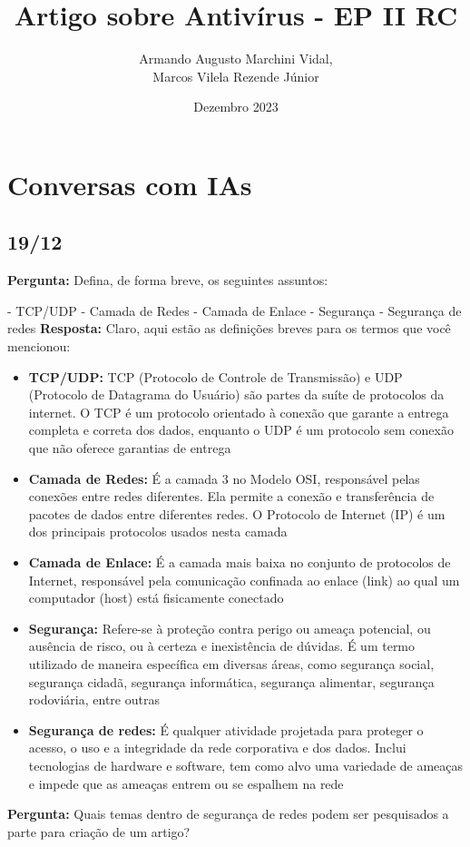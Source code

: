 \documentclass[10pt,conference,twocolumn]{article}
\title{Artigo sobre Antivírus - EP II RC}
\author{Armando Augusto Marchini Vidal,\\
Marcos Vilela Rezende Júnior}
\date{Dezembro 2023}
\begin{document}
\maketitle

\section{Conversas com IAs}
\subsection{19/12}
\textbf{Pergunta:}\newline
Defina, de forma breve, os seguintes assuntos:

- TCP/UDP\newline
- Camada de Redes\newline
- Camada de Enlace\newline
- Segurança\newline
- Segurança de redes\newline
\textbf{Resposta:}\newline
Claro, aqui estão as definições breves para os termos que você mencionou:\newline
\begin{itemize}
    \item \textbf{TCP/UDP:} TCP (Protocolo de Controle de Transmissão) e UDP (Protocolo de Datagrama do Usuário) são partes da suíte de protocolos da internet. O TCP é um protocolo orientado à conexão que garante a entrega completa e correta dos dados, enquanto o UDP é um protocolo sem conexão que não oferece garantias de entrega
    \item \textbf{Camada de Redes:} É a camada 3 no Modelo OSI, responsável pelas conexões entre redes diferentes. Ela permite a conexão e transferência de pacotes de dados entre diferentes redes. O Protocolo de Internet (IP) é um dos principais protocolos usados nesta camada
    \item \textbf{Camada de Enlace:} É a camada mais baixa no conjunto de protocolos de Internet, responsável pela comunicação confinada ao enlace (link) ao qual um computador (host) está fisicamente conectado
    \item \textbf{Segurança:} Refere-se à proteção contra perigo ou ameaça potencial, ou ausência de risco, ou à certeza e inexistência de dúvidas. É um termo utilizado de maneira específica em diversas áreas, como segurança social, segurança cidadã, segurança informática, segurança alimentar, segurança rodoviária, entre outras
    \item \textbf{Segurança de redes:} É qualquer atividade projetada para proteger o acesso, o uso e a integridade da rede corporativa e dos dados. Inclui tecnologias de hardware e software, tem como alvo uma variedade de ameaças e impede que as ameaças entrem ou se espalhem na rede
\end{itemize}
\textbf{Pergunta:}\newline
Quais temas dentro de segurança de redes podem ser pesquisados a parte para criação de um artigo?\newline
\end{document}

